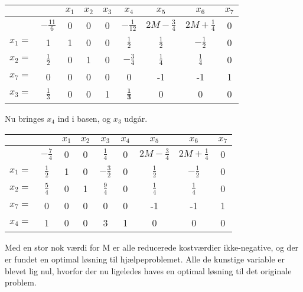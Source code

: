 \begin{eks}
\begin{center}
\begin{tabular}{|c|c|ccccccc|}
\hline
	 &  & $x_1$ & $x_2$ & $x_3$ & $x_4$ & $x_5$ & $x_6$ & $x_7$ \\
\hline
	 & $- \frac{11}{6}$ & 0 & 0 & 0 & $-\frac{1}{12}$ & $2M-\frac{3}{4}$ & $2M+ \frac{1}{4}$ & 0 \\
\hline
	$x_1=$ & 1 & 1 & 0 & 0 & $\frac{1}{2}$ & $\frac{1}{2}$ & $-\frac{1}{2}$ & 0 \\
	$x_2=$ & $\frac{1}{2}$ & 0 & 1 & 0 & $-\frac{3}{4}$ & $\frac{1}{4}$ & $\frac{1}{4}$ & 0 \\
	$x_7=$ & 0 & 0 & 0 & 0 & 0 & -1 & -1 & 1 \\
	$x_3=$ & $\frac{1}{3}$ & 0 & 0 & 1 & $\mathbf{\frac{1}{3}}$ & 0 & 0 & 0 \\
\hline
\end{tabular}
\end{center}

Nu bringes $x_4$ ind i basen, og $x_3$ udgår. 

\begin{center}
\begin{tabular}{|c|c|ccccccc|}
\hline
	 &  & $x_1$ & $x_2$ & $x_3$ & $x_4$ & $x_5$ & $x_6$ & $x_7$ \\
\hline
	 & $- \frac{7}{4}$ & 0 & 0 & $\frac{1}{4}$ & 0 & $2M-\frac{3}{4}$ & $2M+ \frac{1}{4}$ & 0 \\
\hline
	$x_1=$ & $\frac{1}{2}$ & 1 & 0 & $-\frac{3}{2}$ & 0 & $\frac{1}{2}$ & $-\frac{1}{2}$ & 0 \\
	$x_2=$ & $\frac{5}{4}$ & 0 & 1 & $\frac{9}{4}$ & 0 & $\frac{1}{4}$ & $\frac{1}{4}$ & 0 \\
	$x_7=$ & 0 & 0 & 0 & 0 & 0 & -1 & -1 & 1 \\
	$x_4=$ & 1 & 0 & 0 & 3 & 1 & 0 & 0 & 0 \\
\hline
\end{tabular}
\end{center}

Med en stor nok værdi for M er alle reducerede kostværdier ikke-negative, og der er fundet en optimal løsning til hjælpeproblemet.
Alle de kunstige variable er blevet lig nul, hvorfor der nu ligeledes haves en optimal løsning til det originale problem.  
\end{eks}